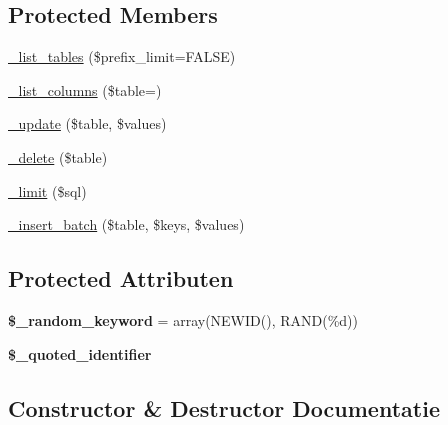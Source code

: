 \subsection*{Protected Members}
\begin{DoxyCompactItemize}
\item 
\mbox{\hyperlink{class_c_i___d_b__pdo__dblib__driver_a435c0f3ce54fe7daa178baa8532ebd54}{\+\_\+list\+\_\+tables}} (\$prefix\+\_\+limit=F\+A\+L\+SE)
\item 
\mbox{\hyperlink{class_c_i___d_b__pdo__dblib__driver_a7ccb7f9c301fe7f0a9db701254142b63}{\+\_\+list\+\_\+columns}} (\$table=\textquotesingle{}\textquotesingle{})
\item 
\mbox{\hyperlink{class_c_i___d_b__pdo__dblib__driver_a2540b03a93fa73ae74c10d0e16fc073e}{\+\_\+update}} (\$table, \$values)
\item 
\mbox{\hyperlink{class_c_i___d_b__pdo__dblib__driver_a133ea8446ded52589bd22cc9163d0896}{\+\_\+delete}} (\$table)
\item 
\mbox{\hyperlink{class_c_i___d_b__pdo__dblib__driver_a3a02ea06541b8ecc25a33a61651562c8}{\+\_\+limit}} (\$sql)
\item 
\mbox{\hyperlink{class_c_i___d_b__pdo__dblib__driver_a1978e1358c812587a46e242630365099}{\+\_\+insert\+\_\+batch}} (\$table, \$keys, \$values)
\end{DoxyCompactItemize}
\subsection*{Protected Attributen}
\begin{DoxyCompactItemize}
\item 
\mbox{\label{class_c_i___d_b__pdo__dblib__driver_a10213aa6e05f6d924d3277bb1d2fea00}} 
{\bfseries \$\+\_\+random\+\_\+keyword} = array(\textquotesingle{}N\+E\+W\+ID()\textquotesingle{}, \textquotesingle{}R\+A\+ND(\%d)\textquotesingle{})
\item 
\mbox{\label{class_c_i___d_b__pdo__dblib__driver_a1dae2f0e9ad7299438a9976d6cdbf2ad}} 
{\bfseries \$\+\_\+quoted\+\_\+identifier}
\end{DoxyCompactItemize}


\subsection{Constructor \& Destructor Documentatie}
\mbox{\label{class_c_i___d_b__pdo__dblib__driver_a9162320adff1a1a4afd7f2372f753a3e}} 
